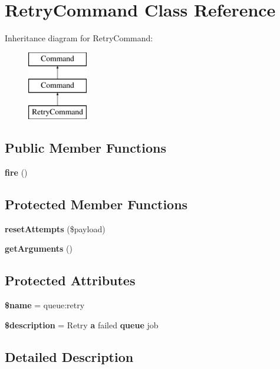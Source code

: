 \section{Retry\+Command Class Reference}
\label{class_illuminate_1_1_queue_1_1_console_1_1_retry_command}
Inheritance diagram for Retry\+Command\+:\begin{figure}[H]
\begin{center}
\leavevmode
\includegraphics[height=3.000000cm]{class_illuminate_1_1_queue_1_1_console_1_1_retry_command}
\end{center}
\end{figure}
\subsection*{Public Member Functions}
\begin{DoxyCompactItemize}
\item 
{\bf fire} ()
\end{DoxyCompactItemize}
\subsection*{Protected Member Functions}
\begin{DoxyCompactItemize}
\item 
{\bf reset\+Attempts} (\$payload)
\item 
{\bf get\+Arguments} ()
\end{DoxyCompactItemize}
\subsection*{Protected Attributes}
\begin{DoxyCompactItemize}
\item 
{\bf \$name} = \textquotesingle{}queue\+:retry\textquotesingle{}
\item 
{\bf \$description} = \textquotesingle{}Retry {\bf a} failed {\bf queue} job\textquotesingle{}
\end{DoxyCompactItemize}


\subsection{Detailed Description}



